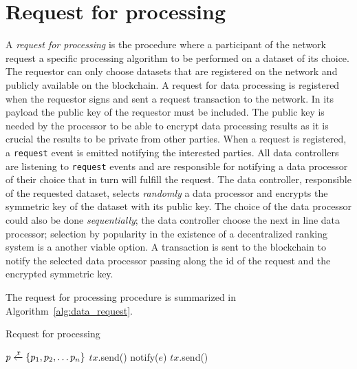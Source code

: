 \section{Request for processing}
\label{solution:flow:pr_req}

A \textit{request for processing} is the procedure where a participant of the network request a specific processing algorithm to be performed on a dataset of its choice. The requestor can only choose datasets that are registered on the network and publicly available on the blockchain. A request for data processing is registered when the requestor signs and sent a request transaction to the network. In its payload the public key of the requestor must be included. The public key is needed by the processor to be able to encrypt data processing results as it is crucial the results to be private from other parties. When a request is registered, a \verb|request| event is emitted notifying the interested parties. All data controllers are listening to \verb|request| events and are responsible for notifying a data processor of their choice that in turn will fulfill the request. The data controller, responsible of the requested dataset, selects \textit{randomly} a data processor and encrypts the symmetric key of the dataset with its public key. The choice of the data processor could also be done \textit{sequentially}; the data controller choose the next in line data processor; selection by popularity in the existence of a decentralized ranking system is a another viable option. A transaction is sent to the blockchain to notify the selected data processor passing along the id of the request and the encrypted symmetric key.

The request for processing procedure is summarized in Algorithm~\ref{alg:data_request}.

\begin{algorithm}[!htb]
  \caption{Request for processing}\label{alg:data_request}
  \begin{algorithmic}[1]
    \State $p \xleftarrow{\mathtt{r}} \{ p_1, p_2, \dots p_n \}$ 
     
     
     
    \State $tx$.send()
    \State {}
  \EndFunction
     
        \State notify($e$) 
      \EndIf
    \EndWhile
  \EndProcedure
     
    \State $tx$.send()
    \State {}
  \EndProcedure
  \end{algorithmic}
\end{algorithm}

